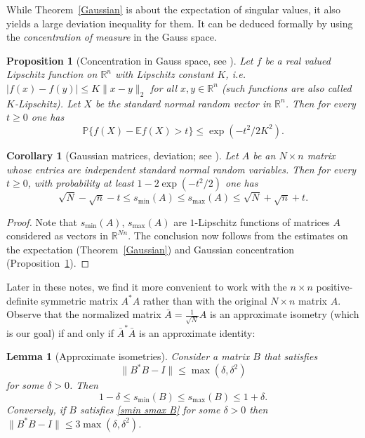 \documentclass[10pt, openany]{book}
\newtheorem{proposition}[theorem]{Proposition}
\newtheorem{corollary}[theorem]{Corollary}
\newtheorem{lemma}[theorem]{Lemma}
\theoremstyle{remark}
\def \R {\mathbb{R}}
\def \E {\mathbb{E}}
\def \P {\mathbb{P}}
\def \d {\delta}
\def \smin {s_{\min}}
\def \smax {s_{\max}}
\begin{document}
While Theorem~\ref{Gaussian} is about the expectation of singular values, it also yields
a large deviation inequality for them. 
It can be deduced formally by using the {\em concentration of measure} 
in the Gauss space.

\begin{proposition}[Concentration in Gauss space, see \cite{Ledoux}]
  		\label{Gaussian concentration}
  Let $f$ be a real valued Lipschitz function on $\R^n$ with Lipschitz constant $K$, i.e. 
  $|f(x)-f(y)| \le K \|x-y\|_2$ for all $x,y \in \R^n$ (such functions are also called $K$-Lipschitz). 
  Let $X$ be the standard normal random 
  vector in $\R^n$. Then for every $t \ge 0$ one has
  $$
  \P \{ f(X) - \E f(X) > t \} \le \exp(-t^2/2K^2).
  $$
\end{proposition}

\begin{corollary}[Gaussian matrices, deviation; see \cite{DS}] 	 \label{Gaussian deviation}
  Let $A$ be an $N \times n$ matrix whose entries
  are independent standard normal random variables. 
  Then for every $t \ge 0$, with probability at least $1 - 2 \exp(-t^2/2)$ one has
  $$
  \sqrt{N} - \sqrt{n} - t \le \smin(A) \le \smax(A) \le
  \sqrt{N} + \sqrt{n} + t. 
  $$
\end{corollary}

\begin{proof}
Note that $\smin(A)$, $\smax(A)$ are $1$-Lipschitz functions of matrices $A$ considered
as vectors in $\R^{Nn}$. The conclusion now follows from the estimates on the expectation
(Theorem~\ref{Gaussian}) and Gaussian concentration (Proposition~\ref{Gaussian concentration}). 
\end{proof}

Later in these notes, we find it more convenient to work with the $n \times n$ 
positive-definite symmetric matrix $A^*A$ rather than with the original $N \times n$ matrix $A$.
Observe that the normalized matrix $\bar{A} = \frac{1}{\sqrt{N}} A$ is an approximate isometry 
(which is our goal) if and only if $\bar{A}^*\bar{A}$ is an approximate identity:

\begin{lemma}[Approximate isometries]	 \label{approximate isometries}
  Consider a matrix $B$ that satisfies 
  \begin{equation}							\label{B*B}
  \|B^*B - I\| \le \max(\d,\d^2)
  \end{equation}
  for some $\d > 0$. Then 
  \begin{equation}							\label{smin smax B}
  1-\d \le \smin(B) \le \smax(B) \le 1+\d.
  \end{equation}
  Conversely, if $B$ satisfies \eqref{smin smax B} for some $\d > 0$ then
  $\|B^*B - I\| \le 3 \max(\d,\d^2)$.
\end{lemma}
\end{document}

